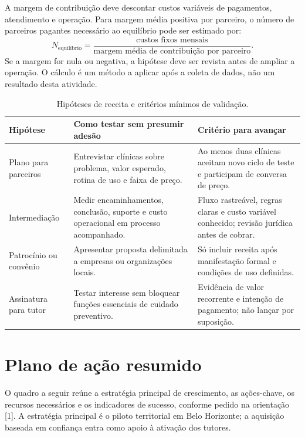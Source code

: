 \documentclass[12pt,a4paper]{article}
\begin{document}
A margem de contribuição deve descontar custos variáveis de pagamentos, atendimento e operação. Para margem média positiva por parceiro, o número de parceiros pagantes necessário ao equilíbrio pode ser estimado por:
\[
N_{\text{equilíbrio}} = \frac{\text{custos fixos mensais}}{\text{margem média de contribuição por parceiro}}.
\]
Se a margem for nula ou negativa, a hipótese deve ser revista antes de ampliar a operação. O cálculo é um método a aplicar após a coleta de dados, não um resultado desta atividade.

\begin{table}[H]
\centering
\small
\caption{Hipóteses de receita e critérios mínimos de validação.}
\begin{tabularx}{\textwidth}{P{3.0cm}YY}
\toprule
\textbf{Hipótese} & \textbf{Como testar sem presumir adesão} & \textbf{Critério para avançar} \\
\midrule
Plano para parceiros & Entrevistar clínicas sobre problema, valor esperado, rotina de uso e faixa de preço. & Ao menos duas clínicas aceitam novo ciclo de teste e participam de conversa de preço. \\
Intermediação & Medir encaminhamentos, conclusão, suporte e custo operacional em processo acompanhado. & Fluxo rastreável, regras claras e custo variável conhecido; revisão jurídica antes de cobrar. \\
Patrocínio ou convênio & Apresentar proposta delimitada a empresas ou organizações locais. & Só incluir receita após manifestação formal e condições de uso definidas. \\
Assinatura para tutor & Testar interesse sem bloquear funções essenciais de cuidado preventivo. & Evidência de valor recorrente e intenção de pagamento; não lançar por suposição. \\
\bottomrule
\end{tabularx}
\end{table}

\section{Plano de ação resumido}

O quadro a seguir reúne a estratégia principal de crescimento, as ações-chave, os recursos necessários e os indicadores de sucesso, conforme pedido na orientação [1]. A estratégia principal é o piloto territorial em Belo Horizonte; a aquisição baseada em confiança entra como apoio à ativação dos tutores.
\end{document}
